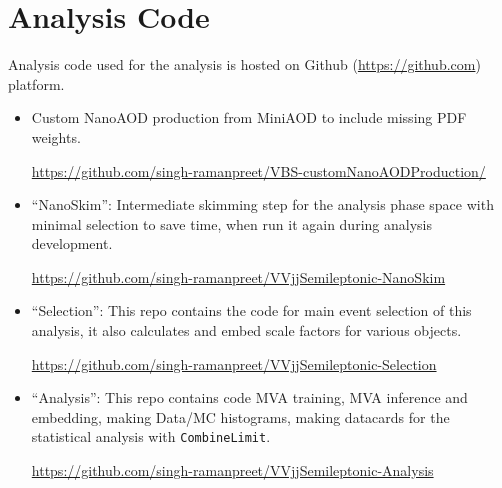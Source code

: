 \chapter{
  Analysis Code
 }


Analysis code used for the analysis is hosted on
Github (\url{https://github.com}) platform.

\begin{itemize}
  \item Custom NanoAOD production from MiniAOD
        to include missing \gls{PDF} weights.

        \url{https://github.com/singh-ramanpreet/VBS-customNanoAODProduction/}

  \item ``NanoSkim'': Intermediate skimming step for the analysis
        phase space with minimal selection to save time,
        when run it again during analysis development.

        \url{https://github.com/singh-ramanpreet/VVjjSemileptonic-NanoSkim}

  \item ``Selection'': This repo contains the code for main event
        selection of this analysis, it also calculates and embed scale factors
        for various objects.

        \url{https://github.com/singh-ramanpreet/VVjjSemileptonic-Selection}

  \item ``Analysis'': This repo contains code \gls{MVA} training,
        \gls{MVA} inference and embedding, making Data/MC histograms,
        making datacards for the statistical analysis with \texttt{CombineLimit}.

        \url{https://github.com/singh-ramanpreet/VVjjSemileptonic-Analysis}

\end{itemize}
